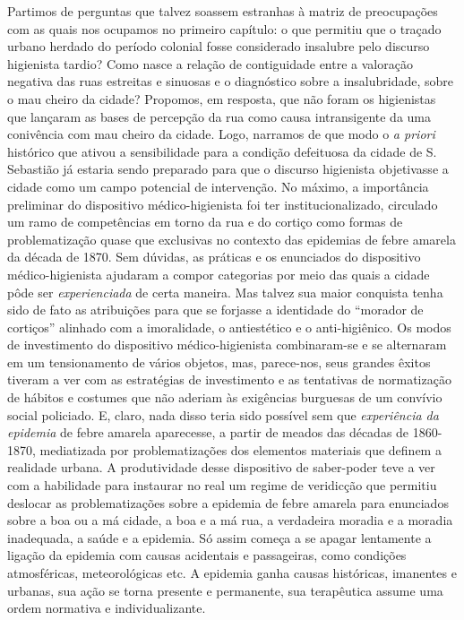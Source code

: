 Partimos de perguntas que talvez soassem estranhas à matriz de
preocupações com as quais nos ocupamos no primeiro capítulo: o que
permitiu que o traçado urbano herdado do período colonial fosse
considerado insalubre pelo discurso higienista tardio? Como nasce a
relação de contiguidade entre a valoração negativa das ruas estreitas e
sinuosas e o diagnóstico sobre a insalubridade, sobre o mau cheiro da
cidade? Propomos, em resposta, que não foram os higienistas que lançaram
as bases de percepção da rua como causa intransigente da uma conivência
com mau cheiro da cidade. Logo, narramos de que modo o \emph{a priori}
histórico que ativou a sensibilidade para a condição defeituosa da
cidade de S. Sebastião já estaria sendo preparado para que o discurso
higienista objetivasse a cidade como um campo potencial de intervenção.
No máximo, a importância preliminar do dispositivo médico-higienista foi
ter institucionalizado, circulado um ramo de competências em torno da
rua e do cortiço como formas de problematização quase que exclusivas no
contexto das epidemias de febre amarela da década de 1870. Sem dúvidas,
as práticas e os enunciados do dispositivo médico-higienista ajudaram a
compor categorias por meio das quais a cidade pôde ser
\emph{experienciada} de certa maneira. Mas talvez sua maior conquista
tenha sido de fato as atribuições para que se forjasse a identidade do
``morador de cortiços'' alinhado com a imoralidade, o antiestético e o
anti-higiênico. Os modos de investimento do dispositivo
médico-higienista combinaram-se e se alternaram em um tensionamento de
vários objetos, mas, parece-nos, seus grandes êxitos tiveram a ver com
as estratégias de investimento e as tentativas de normatização de
hábitos e costumes que não aderiam às exigências burguesas de um
convívio social policiado. E, claro, nada disso teria sido possível sem
que \emph{experiência da epidemia} de febre amarela aparecesse, a partir
de meados das décadas de 1860-1870, mediatizada por problematizações dos
elementos materiais que definem a realidade urbana. A produtividade
desse dispositivo de saber-poder teve a ver com a habilidade para
instaurar no real um regime de veridicção que permitiu deslocar as
problematizações sobre a epidemia de febre amarela para enunciados sobre
a boa ou a má cidade, a boa e a má rua, a verdadeira moradia e a moradia
inadequada, a saúde e a epidemia. Só assim começa a se apagar lentamente
a ligação da epidemia com causas acidentais e passageiras, como
condições atmosféricas, meteorológicas etc. A epidemia ganha causas
históricas, imanentes e urbanas, sua ação se torna presente e
permanente, sua terapêutica assume uma ordem normativa e
individualizante.

